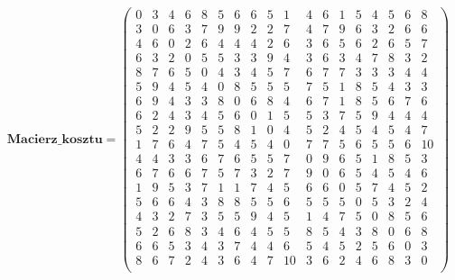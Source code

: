 \par
$$
\mathbf{Macierz\_kosztu} =
\left( \begin{array}{cccccccccccccccccc}
   0& 3& 4& 6& 8& 5& 6& 6& 5& 1& 4& 6& 1& 5& 4& 5& 6& 8\\
    3& 0& 6& 3& 7& 9& 9& 2& 2& 7& 4& 7& 9& 6& 3& 2& 6& 6\\
    4& 6& 0& 2& 6& 4& 4& 4& 2& 6& 3& 6& 5& 6& 2& 6& 5& 7\\
    6& 3& 2& 0& 5& 5& 3& 3& 9& 4& 3& 6& 3& 4& 7& 8& 3& 2\\
    8& 7& 6& 5& 0& 4& 3& 4& 5& 7& 6& 7& 7& 3& 3& 3& 4& 4\\
    5& 9& 4& 5& 4& 0& 8& 5& 5& 5& 7& 5& 1& 8& 5& 4& 3& 3\\
    6& 9& 4& 3& 3& 8& 0& 6& 8& 4& 6& 7& 1& 8& 5& 6& 7& 6\\
    6& 2& 4& 3& 4& 5& 6& 0& 1& 5& 5& 3& 7& 5& 9& 4& 4& 4\\
    5& 2& 2& 9& 5& 5& 8& 1& 0& 4& 5& 2& 4& 5& 4& 5& 4& 7\\
    1& 7& 6& 4& 7& 5& 4& 5& 4& 0& 7& 7& 5& 6& 5& 5& 6& 10\\
    4& 4& 3& 3& 6& 7& 6& 5& 5& 7& 0& 9& 6& 5& 1& 8& 5& 3\\
    6& 7& 6& 6& 7& 5& 7& 3& 2& 7& 9& 0& 6& 5& 4& 5& 4& 6\\
    1& 9& 5& 3& 7& 1& 1& 7& 4& 5& 6& 6& 0& 5& 7& 4& 5& 2\\
    5& 6& 6& 4& 3& 8& 8& 5& 5& 6& 5& 5& 5& 0& 5& 3& 2& 4\\
    4& 3& 2& 7& 3& 5& 5& 9& 4& 5& 1& 4& 7& 5& 0& 8& 5& 6\\
    5& 2& 6& 8& 3& 4& 6& 4& 5& 5& 8& 5& 4& 3& 8& 0& 6& 8\\
    6& 6& 5& 3& 4& 3& 7& 4& 4& 6& 5& 4& 5& 2& 5& 6& 0& 3\\
    8& 6& 7& 2& 4& 3& 6& 4& 7& 10& 3& 6& 2& 4& 6& 8& 3& 0\\
\end{array} \right)
$$

